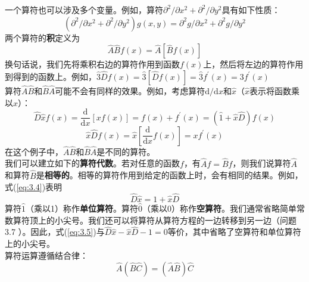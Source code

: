 	\indent 一个算符也可以涉及多个变量。例如，算符$\partial^2/\partial x^2+\partial^2/\partial y^2$具有如下性质：
	\begin{equation*}
		\left(\partial^2/\partial x^2+\partial^2/\partial y^2\right)g\left(x,y\right)= \partial^2 g/\partial x^2 + \partial^2 g/\partial y^2
	\end{equation*}
	\indent 两个算符的\textbf{积}定义为
	\begin{equation}
		\boxed{
			\hat{A}\hat{B}f\left(x\right) = \hat{A}\left[\hat{B}f\left(x\right)\right]
		}
		\label{eq:3.3 definition of operators' product}
	\end{equation}
	换句话说，我们先将乘积右边的算符作用到函数$f\left(x\right)$上，然后将左边的算符作用到得到的函数上。例如，$\hat{3}\hat{D}f\left(x\right) = \hat{3}\left[\hat{D}f\left(x\right)\right] = \hat{3}f^{\prime}\left(x\right) = 3f^{\prime}\left(x\right)$\\
	\indent 算符$\hat{A}\hat{B}$和$\hat{B}\hat{A}$可能不会有同样的效果。例如，考虑算符$\mathrm{d}/\mathrm{d}x$和$\hat{x}$（$\hat{x}$表示将函数乘以$x$）：
	\begin{equation}
		\hat{D}\hat{x}f\left(x\right)=\frac{\mathrm{d}}{\mathrm{d}x}\left[xf\left(x\right)\right] = f\left(x\right) + f^{\prime}\left(x\right) = \left(\hat{1}+\hat{x}\hat{D}\right)f\left(x\right)
		\label{eq:3.4}
	\end{equation}
	\begin{equation*}
		\hat{x}\hat{D}f\left(x\right) = \hat{x}\left[\frac{\mathrm{d}}{\mathrm{d}x}f\left(x\right)\right] = xf^{\prime}\left(x\right)
	\end{equation*}
	在这个例子中，$\hat{A}\hat{B}$和$\hat{B}\hat{A}$是不同的算符。\\
	\indent 我们可以建立如下的\textbf{算符代数}。若对任意的函数$f$，有$\hat{A}f = \hat{B}f$，则我们说算符$\hat{A}$和算符$\hat{B}$是\textbf{相等的}。相等的算符作用到给定的函数上时，会有相同的结果。例如，式(\ref{eq:3.4})表明
	\begin{equation}
		\hat{D}\hat{x} = 1 + \hat{x}\hat{D}
		\label{eq:3.5}
	\end{equation}
	算符$\hat{1}$（乘以1）称作\textbf{单位算符}。算符$\hat{0}$（乘以0）称作\textbf{空算符}。我们通常省略简单常数算符顶上的小尖号。我们还可以将算符从算符方程的一边转移到另一边（问题 3.7 ）。因此，式(\ref{eq:3.5})与$\hat{D}\hat{x}-\hat{x}\hat{D}-1 = 0$等价，其中省略了空算符和单位算符上的小尖号。\\
	\indent 算符运算遵循结合律：
	\begin{equation}
		\hat{A}\left(\hat{B}\hat{C}\right) = \left(\hat{A}\hat{B}\right)\hat{C}
		\label{eq:3.6 law of multiplication for operators}
	\end{equation}
